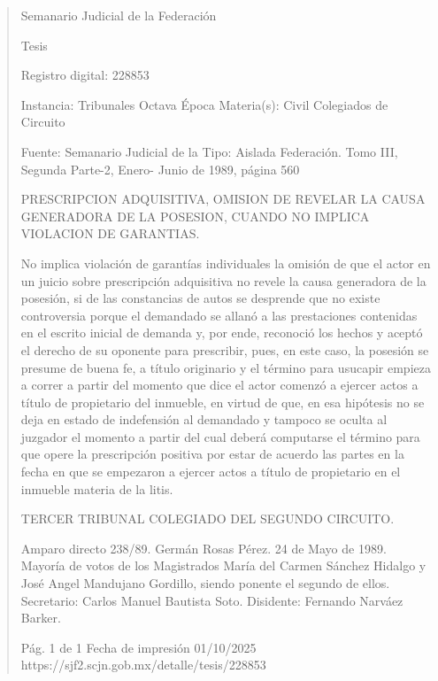 \documentclass[11pt,a4paper]{article}
\begin{document}
\begin{quote}
                                                   Semanario Judicial de la Federación

                                                  Tesis

 Registro digital: 228853

 Instancia: Tribunales            Octava Época                        Materia(s): Civil
 Colegiados de Circuito

                                  Fuente: Semanario Judicial de la    Tipo: Aislada
                                  Federación.
                                  Tomo III, Segunda Parte-2, Enero-
                                  Junio de 1989, página 560


PRESCRIPCION ADQUISITIVA, OMISION DE REVELAR LA CAUSA GENERADORA DE LA
POSESION, CUANDO NO IMPLICA VIOLACION DE GARANTIAS.


No implica violación de garantías individuales la omisión de que el actor en un juicio sobre
prescripción adquisitiva no revele la causa generadora de la posesión, si de las constancias de
autos se desprende que no existe controversia porque el demandado se allanó a las prestaciones
contenidas en el escrito inicial de demanda y, por ende, reconoció los hechos y aceptó el derecho
de su oponente para prescribir, pues, en este caso, la posesión se presume de buena fe, a título
originario y el término para usucapir empieza a correr a partir del momento que dice el actor
comenzó a ejercer actos a título de propietario del inmueble, en virtud de que, en esa hipótesis no
se deja en estado de indefensión al demandado y tampoco se oculta al juzgador el momento a partir
del cual deberá computarse el término para que opere la prescripción positiva por estar de acuerdo
las partes en la fecha en que se empezaron a ejercer actos a título de propietario en el inmueble
materia de la litis.

TERCER TRIBUNAL COLEGIADO DEL SEGUNDO CIRCUITO.


Amparo directo 238/89. Germán Rosas Pérez. 24 de Mayo de 1989. Mayoría de votos de los
Magistrados María del Carmen Sánchez Hidalgo y José Angel Mandujano Gordillo, siendo ponente
el segundo de ellos. Secretario: Carlos Manuel Bautista Soto. Disidente: Fernando Narváez Barker.




                                             Pág. 1 de 1           Fecha de impresión 01/10/2025
  https://sjf2.scjn.gob.mx/detalle/tesis/228853

\end{quote}
\end{document}
